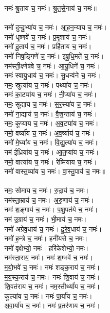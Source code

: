 नमः॑ श्रु॒ताय॑ च॒ नमः॑। श्रु॒त॒से॒नाय॑ च॒ नमः॑॥\\
\\
नमो॑ दुन्दु॒भ्या॑य च॒ नमः॑। आ॒ह॒न॒न्या॑य च॒ नमः॑।\\
नमो॑ धृ॒ष्णवे॑ च॒ नमः॑। प्र॒मृ॒शाय॑ च॒ नमः॑।\\
नमो॑ दू॒ताय॑ च॒ नमः॑। प्रहि॑ताय च॒ नमः॑।\\
नमो॑ निष॒ङ्गिणे॑ च॒ नमः॑। इ॒षु॒धि॒मते॑ च॒ नमः॑।\\
नम॑स्ती॒क्ष्णेष॑वे च॒ नमः॑। आ॒यु॒धिने॑ च॒ नमः॑।\\
नमः॑ स्वायु॒धाय॑ च॒ नमः॑। सु॒धन्व॑ने च॒ नमः॑।\\
नमः॒ स्रुत्या॑य च॒ नमः॑। पथ्या॑य च॒ नमः॑।\\
नमः॑ का॒ट्या॑य च॒ नमः॑। नी॒प्या॑य च॒ नमः॑।\\
नमः॒ सूद्या॑य च॒ नमः॑। स॒र॒स्या॑य च॒ नमः॑।\\
नमो॑ ना॒द्याय॑ च॒ नमः॑। वै॒श॒न्ताय॑ च॒ नमः॑। \\
नमः॒ कूप्या॑य च॒ नमः॑। अ॒व॒ट्या॑य च॒ नमः॑।\\
नमो॒ वर्ष्या॑य च॒ नमः॑। अ॒व॒र्ष्याय॑ च॒ नमः॑।\\
नमो॑ मे॒घ्या॑य च॒ नमः॑। वि॒द्यु॒त्या॑य च॒ नमः॑।\\
नम॑ ई॒ध्रिया॑य च॒ नमः॑। आ॒त॒प्या॑य च॒ नमः॑।\\
नमो॒ वात्या॑य च॒ नमः॑। रेष्मि॑याय च॒ नमः॑।\\
नमो॑ वास्त॒व्या॑य च॒ नमः॑। वा॒स्तु॒पाय॑ च॒ नमः॑॥\\
\\
नमः॒ सोमा॑य च॒ नमः॑। रु॒द्राय॑ च॒ नमः॑।\\
नम॑स्ता॒म्राय॑ च॒ नमः॑। अ॒रु॒णाय॑ च॒ नमः॑।\\
नमः॑ श॒ङ्गाय॑ च॒ नमः॑। प॒शु॒पत॑ये च॒ नमः॑।\\
नम॑ उ॒ग्राय॑ च॒ नमः॑। भी॒माय॑ च॒ नमः॑।\\
नमो॑ अग्रेव॒धाय॑ च॒ नमः॑। दू॒रे॒व॒धाय॑ च॒ नमः॑।\\
नमो॑ ह॒न्त्रे च॒ नमः॑। हनी॑यसे च॒ नमः॑।\\
नमो॑ वृ॒क्षेभ्यो॒ नमः॑। हरि॑केशेभ्यो॒ नमः॑।\\
नम॑स्ता॒राय॒ नमः॑। नमः॑ श॒म्भवे॑ च॒ नमः॑।\\
म॒यो॒भवे॑ च॒ नमः॑। नमः॑ शङ्क॒राय॑ च॒ नमः॑।\\
म॒य॒स्क॒राय॑ च॒ नमः॑। नमः॑ शि॒वाय॑ च॒ नमः॑।\\
शि॒वत॑राय च॒ नमः॑। नम॒स्तीर्थ्या॑य च॒ नमः॑।\\
कूल्या॑य च॒ नमः॑। नमः॑ पा॒र्या॑य च॒ नमः॑।\\
अ॒वा॒र्या॑य च॒ नमः॑। नमः॑ प्र॒तर॑णाय च॒ नमः॑।\\
